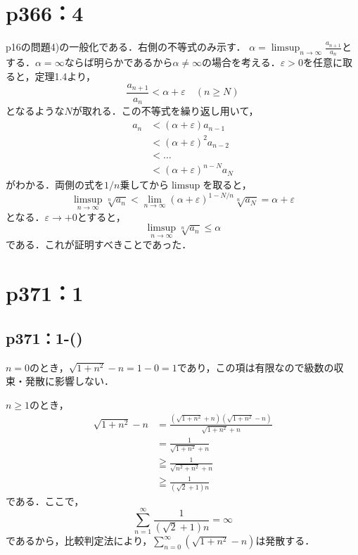 \section*{p366：4}

\begin{tproof}
    p16の問題4)の一般化である．右側の不等式のみ示す．
    $\alpha = \limsup _{n \to \infty} \frac{a_{n+1}}{a_{n}}$とする．$\alpha = \infty$ならば明らかであるから$\alpha \neq \infty$の場合を考える．$\varepsilon > 0$を任意に取ると，定理1.4より，
    \[
        \frac{a_{n+1}}{a_{n}} < \alpha + \varepsilon \quad (n \geq N)
    \]
    となるような$N$が取れる．この不等式を繰り返し用いて，
    \begin{align*}
        a_n
         & < (\alpha + \varepsilon) a_{n-1}   \\
         & < (\alpha + \varepsilon)^2 a_{n-2} \\
         & < \ldots                           \\
         & < (\alpha + \varepsilon)^{n-N} a_N
    \end{align*}
    がわかる．両側の式を$1/n$乗してから$\limsup$を取ると，
    \[
        \limsup _{n \to \infty} \sqrt[n]{a_n} < \lim _{n \to \infty} (\alpha + \varepsilon)^{1-N/n} \sqrt[n]{a_N} = \alpha + \varepsilon
    \]
    となる．$\varepsilon \to +0$とすると，
    \[
        \limsup _{n \to \infty} \sqrt[n]{a_n} \leq \alpha
    \]
    である．これが証明すべきことであった．
\end{tproof}

\newpage

\section*{p371：1}


\subsection*{p371：1-()}

\begin{tanswer}
    $n =0$のとき，$\sqrt{1+n^2}-n =1-0= 1$であり，この項は有限なので級数の収束・発散に影響しない．

    $n \geq 1$のとき，
    \begin{align*}
        \sqrt{1+n^2}-n & = \frac{(\sqrt{1+n^2}+n)(\sqrt{1+n^2}-n)}{\sqrt{1+n^2}+n} \\
                       & = \frac{1}{\sqrt{1+n^2}+n}                                \\
                       & \geqq \frac{1}{\sqrt{n^2+n^2}+n}                          \\
                       & \geqq \frac{1}{(\sqrt{2}+1)n}
    \end{align*}
    である．ここで，
    \[
        \sum_{n=1}^{\infty} \frac{1}{(\sqrt{2}+1)n} =\infty
    \]
    であるから，比較判定法により，$ \sum_{n=0}^{\infty} ( \sqrt{1+n^2}-n )$は発散する．
\end{tanswer}


